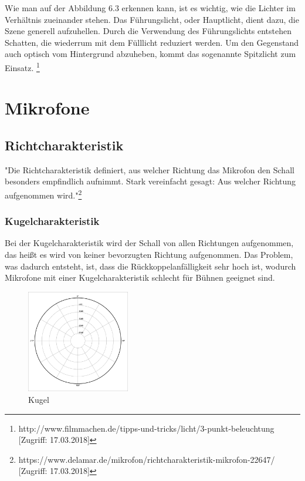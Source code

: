 Wie man auf der Abbildung 6.3 erkennen kann, ist es wichtig, wie die Lichter im Verhältnis zueinander stehen. Das Führungslicht, oder Hauptlicht, dient dazu, die Szene generell aufzuhellen. Durch die Verwendung des Führungslichts entstehen Schatten, die wiederrum mit dem Fülllicht reduziert werden. Um den Gegenstand auch optisch vom Hintergrund abzuheben, kommt das sogenannte Spitzlicht zum Einsatz. \footnote{\label{foot:6}http://www.filmmachen.de/tipps-und-tricks/licht/3-punkt-beleuchtung [Zugriff: 17.03.2018]}
\section{Mikrofone}
\subsection{Richtcharakteristik}
"Die Richtcharakteristik definiert, aus welcher Richtung das Mikrofon den Schall besonders empfindlich aufnimmt. Stark vereinfacht gesagt: Aus welcher Richtung aufgenommen wird."\footnote{\label{foot:7}https://www.delamar.de/mikrofon/richtcharakteristik-mikrofon-22647/ [Zugriff: 17.03.2018]} 
\subsubsection{Kugelcharakteristik}
Bei der Kugelcharakteristik wird der Schall von allen Richtungen aufgenommen, das heißt es wird von keiner bevorzugten Richtung aufgenommen. Das Problem, was dadurch entsteht, ist, dass die Rückkoppelanfälligkeit sehr hoch ist, wodurch Mikrofone mit einer Kugelcharakteristik schlecht für Bühnen geeignet sind. 
\begin{figure}[h]
	\centering
	\includegraphics[width=0.4\textwidth]{abb4} 
	\caption{Kugel}
\end{figure}

